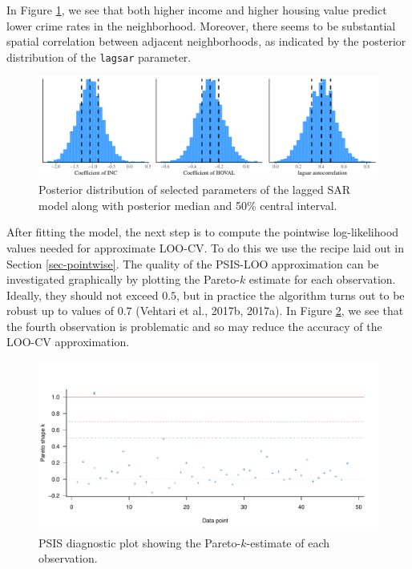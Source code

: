 \documentclass[11pt]{article}
\begin{document}
In Figure \ref{fig:plot-lagsar}, we see that both higher income and
higher housing value predict lower crime rates in the neighborhood.
Moreover, there seems to be substantial spatial correlation between
adjacent neighborhoods, as indicated by the posterior distribution of
the \texttt{lagsar} parameter.

\begin{figure}
\centering
\includegraphics[width=0.95\linewidth]{plot-lagsar-1.pdf}
\caption{Posterior distribution of selected
parameters of the lagged SAR model along with posterior median and 50\%
central interval.}
\label{fig:plot-lagsar}
\end{figure}


After fitting the model, the next step is to compute the pointwise
log-likelihood values needed for approximate LOO-CV. To do this we use
the recipe laid out in Section \ref{sec-pointwise}. The quality of the PSIS-LOO
approximation can be investigated
graphically by plotting the Pareto-\(k\) estimate for each observation.
Ideally, they should not exceed \(0.5\), but in practice the algorithm
turns out to be robust up to values of \(0.7\) (Vehtari et al., 2017b,
2017a). In Figure \ref{fig:psis-res-nb}, we see that the fourth
observation is problematic and so may reduce the accuracy of the LOO-CV
approximation.

\begin{figure}
\centering
\includegraphics[width=0.95\linewidth]{psis-res-nb-1.pdf}
\caption{PSIS diagnostic plot showing the
Pareto-\(k\)-estimate of each observation.}
\label{fig:psis-res-nb}
\end{figure}
\end{document}
